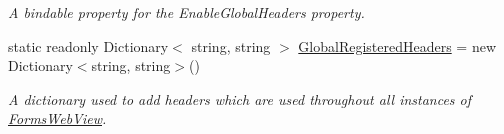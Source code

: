 \begin{DoxyCompactItemize}
\begin{DoxyCompactList}\small\item\em A bindable property for the Enable\+Global\+Headers property. \end{DoxyCompactList}\item 
static readonly Dictionary$<$ string, string $>$ \hyperlink{class_xam_1_1_plugin_1_1_web_view_1_1_abstractions_1_1_forms_web_view_ab9de1bfb5c9c0b3dcb4498354d9f0e45}{Global\+Registered\+Headers} = new Dictionary$<$string, string$>$()
\begin{DoxyCompactList}\small\item\em A dictionary used to add headers which are used throughout all instances of \hyperlink{class_xam_1_1_plugin_1_1_web_view_1_1_abstractions_1_1_forms_web_view}{Forms\+Web\+View}. \end{DoxyCompactList}\end{DoxyCompactItemize}
